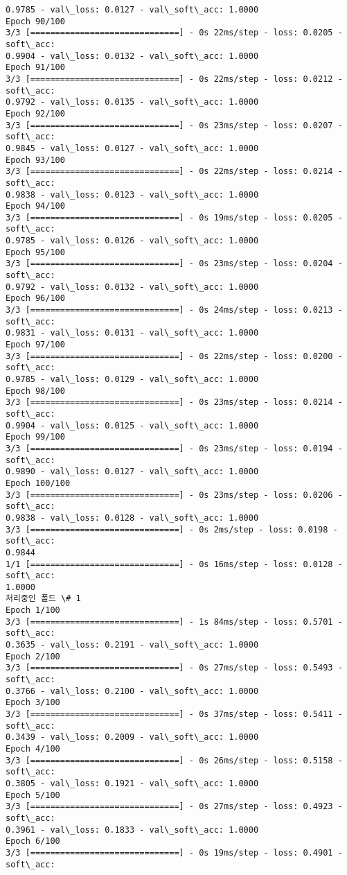 \documentclass[11pt]{article}
\begin{document}
\begin{Verbatim}[commandchars=\\\{\}]
0.9785 - val\_loss: 0.0127 - val\_soft\_acc: 1.0000
Epoch 90/100
3/3 [==============================] - 0s 22ms/step - loss: 0.0205 - soft\_acc:
0.9904 - val\_loss: 0.0132 - val\_soft\_acc: 1.0000
Epoch 91/100
3/3 [==============================] - 0s 22ms/step - loss: 0.0212 - soft\_acc:
0.9792 - val\_loss: 0.0135 - val\_soft\_acc: 1.0000
Epoch 92/100
3/3 [==============================] - 0s 23ms/step - loss: 0.0207 - soft\_acc:
0.9845 - val\_loss: 0.0127 - val\_soft\_acc: 1.0000
Epoch 93/100
3/3 [==============================] - 0s 22ms/step - loss: 0.0214 - soft\_acc:
0.9838 - val\_loss: 0.0123 - val\_soft\_acc: 1.0000
Epoch 94/100
3/3 [==============================] - 0s 19ms/step - loss: 0.0205 - soft\_acc:
0.9785 - val\_loss: 0.0126 - val\_soft\_acc: 1.0000
Epoch 95/100
3/3 [==============================] - 0s 23ms/step - loss: 0.0204 - soft\_acc:
0.9792 - val\_loss: 0.0132 - val\_soft\_acc: 1.0000
Epoch 96/100
3/3 [==============================] - 0s 24ms/step - loss: 0.0213 - soft\_acc:
0.9831 - val\_loss: 0.0131 - val\_soft\_acc: 1.0000
Epoch 97/100
3/3 [==============================] - 0s 22ms/step - loss: 0.0200 - soft\_acc:
0.9785 - val\_loss: 0.0129 - val\_soft\_acc: 1.0000
Epoch 98/100
3/3 [==============================] - 0s 23ms/step - loss: 0.0214 - soft\_acc:
0.9904 - val\_loss: 0.0125 - val\_soft\_acc: 1.0000
Epoch 99/100
3/3 [==============================] - 0s 23ms/step - loss: 0.0194 - soft\_acc:
0.9890 - val\_loss: 0.0127 - val\_soft\_acc: 1.0000
Epoch 100/100
3/3 [==============================] - 0s 23ms/step - loss: 0.0206 - soft\_acc:
0.9838 - val\_loss: 0.0128 - val\_soft\_acc: 1.0000
3/3 [==============================] - 0s 2ms/step - loss: 0.0198 - soft\_acc:
0.9844
1/1 [==============================] - 0s 16ms/step - loss: 0.0128 - soft\_acc:
1.0000
처리중인 폴드 \# 1
Epoch 1/100
3/3 [==============================] - 1s 84ms/step - loss: 0.5701 - soft\_acc:
0.3635 - val\_loss: 0.2191 - val\_soft\_acc: 1.0000
Epoch 2/100
3/3 [==============================] - 0s 27ms/step - loss: 0.5493 - soft\_acc:
0.3766 - val\_loss: 0.2100 - val\_soft\_acc: 1.0000
Epoch 3/100
3/3 [==============================] - 0s 37ms/step - loss: 0.5411 - soft\_acc:
0.3439 - val\_loss: 0.2009 - val\_soft\_acc: 1.0000
Epoch 4/100
3/3 [==============================] - 0s 26ms/step - loss: 0.5158 - soft\_acc:
0.3805 - val\_loss: 0.1921 - val\_soft\_acc: 1.0000
Epoch 5/100
3/3 [==============================] - 0s 27ms/step - loss: 0.4923 - soft\_acc:
0.3961 - val\_loss: 0.1833 - val\_soft\_acc: 1.0000
Epoch 6/100
3/3 [==============================] - 0s 19ms/step - loss: 0.4901 - soft\_acc:

\end{Verbatim}
\end{document}
